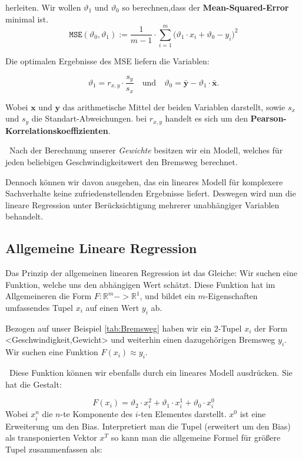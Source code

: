 herleiten. Wir wollen $\vartheta_1$ und $\vartheta_0$ so berechnen,dass der \textbf{Mean-Squared-Error} minimal ist. 
\begin{equation}
\label{eq:mse}
\mathtt{MSE}(\vartheta_0, \vartheta_1) := \frac{1}{m-1} \cdot \sum\limits_{i=1}^m \bigl(\vartheta_1 \cdot x_i + \vartheta_0 - y_i\bigr)^2
\end{equation}

Die optimalen Ergebnisse des MSE liefern die Variablen:

\begin{equation}
\label{eq:theta0}
\vartheta_1 = r_{x,y} \cdot \frac{s_y}{s_x} \quad \mbox{und} \quad \vartheta_0 = \bar{\mathbf{y}} - \vartheta_1 \cdot \bar{\mathbf{x}}.
\end{equation}

Wobei $\mathbf{x}$ und $\mathbf{y}$ das arithmetische Mittel der beiden Variablen darstellt, sowie $s_x$ und $s_y$ die Standart-Abweichungen. bei $r_{x,y}$ handelt es sich um den \textbf{Pearson-Korrelationskoeffizienten}. 

~\newline Nach der Berechnung unserer \textit{Gewichte} besitzen wir ein Modell, welches für jeden beliebigen Geschwindigkeitswert den Bremsweg berechnet. 

Dennoch können wir davon ausgehen, das ein lineares Modell für komplexere Sachverhalte keine zufriedenstellenden Ergebnisse liefert. Deswegen wird nun die lineare Regression unter Berücksichtigung mehrerer unabhängiger Variablen behandelt. 
\subsection{Allgemeine Lineare Regression}
Das Prinzip der allgemeinen linearen Regression ist das Gleiche: Wir suchen eine Funktion, welche uns den abhängigen Wert schätzt. Diese Funktion hat im Allgemeineren die Form  $F:\mathbb{R}^m -> \mathbb{R}^1$, und bildet ein $m$-Eigenschaften umfassendes Tupel $x_i$ auf einen Wert $y_i$ ab. 

Bezogen auf unser Beispiel \ref{tab:Bremsweg} haben wir ein 2-Tupel $x_i$ der Form <Geschwindigkeit,Gewicht> und weiterhin einen dazugehörigen Bremsweg $y_i$. Wir suchen eine Funktion $F(x_i) \approx y_i$. 

~\newline Diese Funktion können wir ebenfalls durch ein lineares Modell ausdrücken. Sie hat die Gestalt: 

\begin{equation}
	F(x_i)= \vartheta_2 \cdot x^2_i + \vartheta_1 \cdot x^1_i + \vartheta_0 \cdot x^0_i
\end{equation}
Wobei $x^n_i$ die $n$-te Komponente des $i$-ten Elementes darstellt. $x^0$ ist eine Erweiterung um den Bias. Interpretiert man die Tupel (erweitert um den Bias) als transponierten Vektor $x^T$ so kann man die allgemeine Formel für größere Tupel zusammenfassen als:

